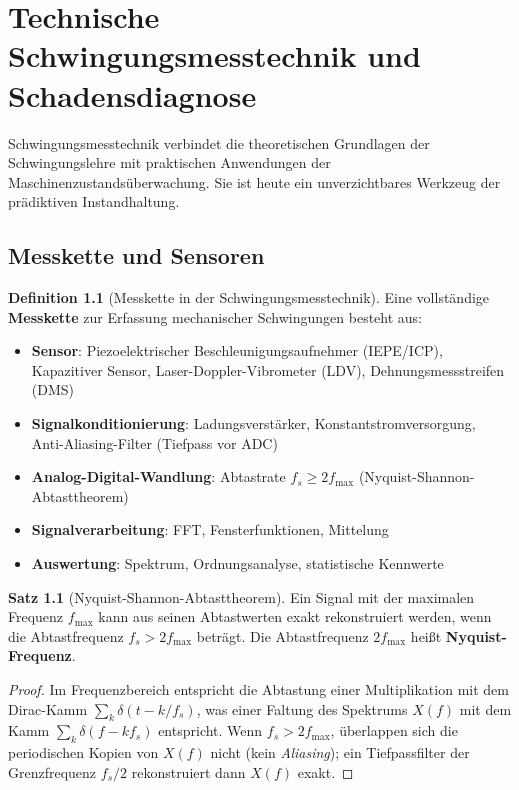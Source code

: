 ﻿\documentclass[a4paper,12pt]{report}
\theoremstyle{definition}
\newtheorem{definition}{Definition}
\newtheorem{satz}{Satz}
\begin{document}
\chapter{Technische Schwingungsmesstechnik und Schadensdiagnose}

Schwingungsmesstechnik verbindet die theoretischen Grundlagen
der Schwingungslehre mit praktischen Anwendungen der Maschinenzustandsüberwachung.
Sie ist heute ein unverzichtbares Werkzeug der prädiktiven Instandhaltung.

\section{Messkette und Sensoren}

\begin{definition}[Messkette in der Schwingungsmesstechnik]
Eine vollständige \textbf{Messkette} zur Erfassung mechanischer Schwingungen
besteht aus:
\begin{itemize}
    \item[-] \textbf{Sensor}: Piezoelektrischer Beschleunigungsaufnehmer (IEPE/ICP),
          Kapazitiver Sensor, Laser-Doppler-Vibrometer (LDV), Dehnungsmessstreifen (DMS)
    \item[-] \textbf{Signalkonditionierung}: Ladungsverstärker, Konstantstromversorgung,
          Anti-Aliasing-Filter (Tiefpass vor ADC)
    \item[-] \textbf{Analog-Digital-Wandlung}: Abtastrate $f_s \ge 2f_{\max}$
          (Nyquist-Shannon-Abtasttheorem)
    \item[-] \textbf{Signalverarbeitung}: FFT, Fensterfunktionen, Mittelung
    \item[-] \textbf{Auswertung}: Spektrum, Ordnungsanalyse, statistische Kennwerte
\end{itemize}
\end{definition}

\begin{satz}[Nyquist-Shannon-Abtasttheorem]
Ein Signal mit der maximalen Frequenz $f_{\max}$ kann aus seinen Abtastwerten
exakt rekonstruiert werden, wenn die Abtastfrequenz $f_s > 2f_{\max}$ beträgt.
Die Abtastfrequenz $2f_{\max}$ heißt \textbf{Nyquist-Frequenz}.
\end{satz}
\begin{proof}
Im Frequenzbereich entspricht die Abtastung einer Multiplikation mit dem
Dirac-Kamm $\sum_k \delta(t-k/f_s)$, was einer Faltung des Spektrums $X(f)$
mit dem Kamm $\sum_k \delta(f - kf_s)$ entspricht.
Wenn $f_s > 2f_{\max}$, überlappen sich die periodischen Kopien von $X(f)$
nicht (kein \emph{Aliasing}); ein Tiefpassfilter der Grenzfrequenz $f_s/2$
rekonstruiert dann $X(f)$ exakt.
\end{proof}
\end{document}
